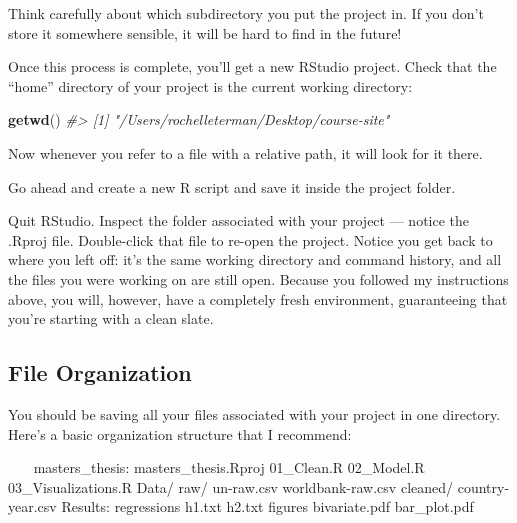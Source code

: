 \documentclass[]{book}
\newenvironment{Shaded}{\begin{snugshade}}{\end{snugshade}}
\newcommand{\KeywordTok}[1]{\textcolor[rgb]{0.13,0.29,0.53}{\textbf{#1}}}
\newcommand{\BaseNTok}[1]{\textcolor[rgb]{0.00,0.00,0.81}{#1}}
\newcommand{\CommentTok}[1]{\textcolor[rgb]{0.56,0.35,0.01}{\textit{#1}}}
\newcommand{\NormalTok}[1]{#1}
\begin{document}
Think carefully about which subdirectory you put the project in. If you
don't store it somewhere sensible, it will be hard to find in the
future!

Once this process is complete, you'll get a new RStudio project. Check
that the ``home'' directory of your project is the current working
directory:

\begin{Shaded}
\begin{Highlighting}[]
\KeywordTok{getwd}\NormalTok{()}
\CommentTok{#> [1] "/Users/rochelleterman/Desktop/course-site"}
\end{Highlighting}
\end{Shaded}

Now whenever you refer to a file with a relative path, it will look for
it there.

Go ahead and create a new R script and save it inside the project
folder.

Quit RStudio. Inspect the folder associated with your project --- notice
the .Rproj file. Double-click that file to re-open the project. Notice
you get back to where you left off: it's the same working directory and
command history, and all the files you were working on are still open.
Because you followed my instructions above, you will, however, have a
completely fresh environment, guaranteeing that you're starting with a
clean slate.

\subsection{File Organization}\label{file-organization}

You should be saving all your files associated with your project in one
directory. Here's a basic organization structure that I recommend:

\begin{Shaded}
\begin{Highlighting}[]
\NormalTok{~~~}
\NormalTok{masters_thesis:}
\NormalTok{  masters_thesis.Rproj}
\NormalTok{  01_Clean.R}
\NormalTok{  02_Model.R}
\NormalTok{  03_Visualizations.R}
\NormalTok{  Data/}
\BaseNTok{    raw/}
\BaseNTok{      un-raw.csv}
\BaseNTok{      worldbank-raw.csv}
\BaseNTok{    cleaned/}
\BaseNTok{      country-year.csv}
\NormalTok{  Results:}
\BaseNTok{    regressions}
\BaseNTok{      h1.txt}
\BaseNTok{      h2.txt}
\BaseNTok{    figures}
\BaseNTok{      bivariate.pdf}
\BaseNTok{      bar_plot.pdf}
\NormalTok{~~~}
\end{Highlighting}
\end{Shaded}
\end{document}
